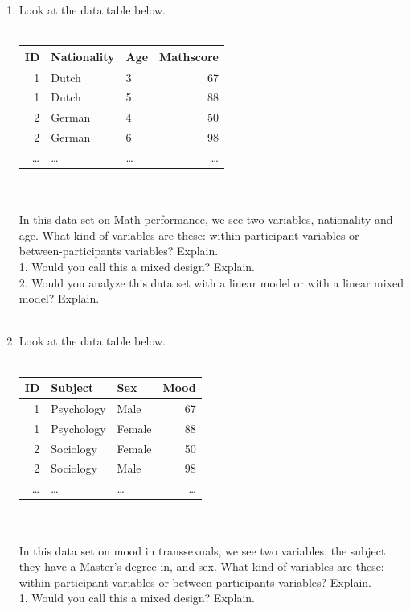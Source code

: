 \documentclass[]{book}\usepackage[]{graphicx}\usepackage[]{color}
\begin{document}
\begin{enumerate}
\\
\item Look at the data table below.
\\
 \\
 \begin{tabular}{rllr}
  ID & Nationality & Age & Mathscore  \\ \hline
  1   & Dutch      &  3 & 67   \\
 1   &  Dutch     &  5 & 88   \\
 2    & German         &  4 & 50   \\
 2   &  German        &  6 & 98  \\
  \dots   & \dots        &  \dots& \dots  \\
 \end{tabular}
\\
\\
In this data set on Math performance, we see two variables, nationality and age. What kind of variables are these: within-participant variables or between-participants variables? Explain.\\
1. Would you call this a mixed design? Explain.\\
2. Would you analyze this data set with a linear model or with a linear mixed model? Explain.
\\
\\
\item Look at the data table below.
\\
 \\
 \begin{tabular}{rllr}
  ID & Subject & Sex & Mood  \\ \hline
  1   & Psychology      &  Male & 67   \\
 1   &  Psychology     &  Female & 88   \\
 2    & Sociology         &  Female & 50   \\
 2   &  Sociology        &  Male & 98  \\
  \dots   & \dots        &  \dots& \dots  \\
 \end{tabular}
\\
\\
In this data set on mood in transsexuals, we see two variables, the subject they have a Master's degree in, and sex. What kind of variables are these: within-participant variables or between-participants variables? Explain.\\
1. Would you call this a mixed design? Explain.\\

\end{enumerate}
\end{document}
